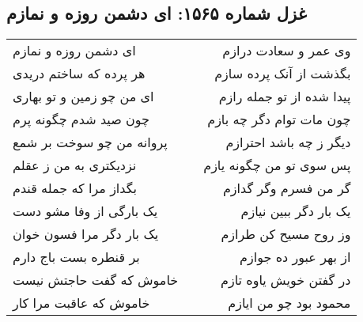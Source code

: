 \begin{center}
\section*{غزل شماره ۱۵۶۵: ای دشمن روزه و نمازم}
\label{sec:1565}
\begin{longtable}{l p{0.5cm} r}
ای دشمن روزه و نمازم
&&
وی عمر و سعادت درازم
\\
هر پرده که ساختم دریدی
&&
بگذشت از آنک پرده سازم
\\
ای من چو زمین و تو بهاری
&&
پیدا شده از تو جمله رازم
\\
چون صید شدم چگونه پرم
&&
چون مات توام دگر چه بازم
\\
پروانه من چو سوخت بر شمع
&&
دیگر ز چه باشد احترازم
\\
نزدیکتری به من ز عقلم
&&
پس سوی تو من چگونه یازم
\\
بگداز مرا که جمله قندم
&&
گر من فسرم وگر گدازم
\\
یک بارگی از وفا مشو دست
&&
یک بار دگر ببین نیازم
\\
یک بار دگر مرا فسون خوان
&&
وز روح مسیح کن طرازم
\\
بر قنطره بست باج دارم
&&
از بهر عبور ده جوازم
\\
خاموش که گفت حاجتش نیست
&&
در گفتن خویش یاوه تازم
\\
خاموش که عاقبت مرا کار
&&
محمود بود چو من ایازم
\\
\end{longtable}
\end{center}
